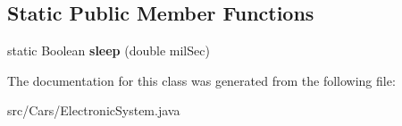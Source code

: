 \subsection*{Static Public Member Functions}
\begin{DoxyCompactItemize}
\item 
\hypertarget{classCars_1_1ElectronicSystem_a8ab7e7ed15db6c4bce5c5186a1fc3a93}{}static Boolean {\bfseries sleep} (double mil\+Sec)\label{classCars_1_1ElectronicSystem_a8ab7e7ed15db6c4bce5c5186a1fc3a93}

\end{DoxyCompactItemize}


The documentation for this class was generated from the following file\+:\begin{DoxyCompactItemize}
\item 
src/\+Cars/Electronic\+System.\+java\end{DoxyCompactItemize}
